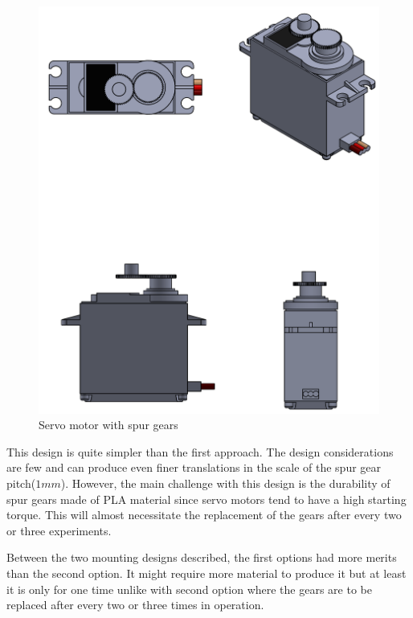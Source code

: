 \begin{enumerate}
\begin{enumerate}
\begin{enumerate}
\begin{itemize}
\begin{figure}[H]
                  \includegraphics{Figures/ServoMotorWithSpurGears.PNG}
                  \caption{Servo motor with spur gears}
                  \label{fig:servo_motor_with_spur_gears}
              \end{figure}
              This design is quite simpler than the first approach. The design considerations are few and can produce even finer translations in the scale of the spur gear pitch($1 mm$). However, the main challenge with this design is the durability of spur gears made of PLA material since servo motors tend to have a high starting torque. This will almost necessitate the replacement of the gears after every two or three experiments.  
          \end{itemize}
     \end{enumerate}
     \par
     Between the two mounting designs described, the first options had more merits than the second option. It might require more material to produce it but at least it is only for one time unlike with second option where the gears are to be replaced after every two or three times in operation.
     \par 

\end{enumerate}
\end{enumerate}
